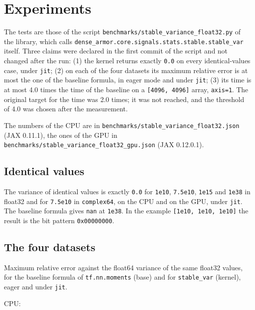 \documentclass[11pt]{article}
\begin{document}
\section{Experiments}

The tests are those of the script \texttt{benchmarks/stable\_variance\_float32.py} of the library, which calls \texttt{dense\_armor.core.signals.stats.stable.stable\_var} itself. Three claims were declared in the first commit of the script and not changed after the run: (1) the kernel returns exactly \texttt{0.0} on every identical-values case, under \texttt{jit}; (2) on each of the four datasets its maximum relative error is at most the one of the baseline formula, in eager mode and under \texttt{jit}; (3) its time is at most 4.0 times the time of the baseline on a \texttt{[4096, 4096]} array, \texttt{axis=1}. The original target for the time was 2.0 times; it was not reached, and the threshold of 4.0 was chosen after the measurement.

The numbers of the CPU are in \texttt{benchmarks/stable\_variance\_float32.json} (JAX 0.11.1), the ones of the GPU in \texttt{benchmarks/stable\_variance\_float32\_gpu.json} (JAX 0.12.0.1).

\subsection{Identical values}

The variance of identical values is exactly \texttt{0.0} for \texttt{1e10}, \texttt{7.5e10}, \texttt{1e15} and \texttt{1e38} in float32 and for \texttt{7.5e10} in \texttt{complex64}, on the CPU and on the GPU, under \texttt{jit}. The baseline formula gives \texttt{nan} at \texttt{1e38}. In the example \texttt{[1e10, 1e10, 1e10]} the result is the bit pattern \texttt{0x00000000}.

\subsection{The four datasets}

Maximum relative error against the float64 variance of the same float32 values, for the baseline formula of \texttt{tf.nn.moments} (base) and for \texttt{stable\_var} (kernel), eager and under \texttt{jit}.

CPU:
\end{document}
